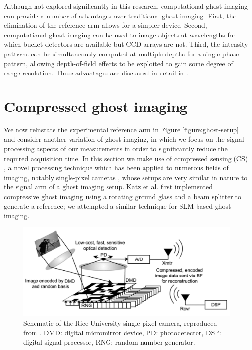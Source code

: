 Although not explored significantly in this research, computational ghost imaging can provide a number of advantages over traditional ghost imaging. First, the elimination of the reference arm allows for a simpler device. Second, computational ghost imaging can be used to image objects at wavelengths for which bucket detectors are available but CCD arrays are not. Third, the intensity patterns can be simultaneously computed at multiple depths for a single phase pattern, allowing depth-of-field effects to be exploited to gain some degree of range resolution. These advantages are discussed in detail in \cite{erkmen-from}.

\section{Compressed ghost imaging}

We now reinstate the experimental reference arm in Figure \ref{figure:ghost-setup} and consider another variation of ghost imaging, in which we focus on the signal processing aspects of our measurements in order to significantly reduce the required acquisition time. In this section we make use of compressed sensing (CS) \cite{candes-stable}, a novel processing technique which has been applied to numerous fields of imaging, notably single-pixel cameras \cite{duarte-single}, whose setups are very similar in nature to the signal arm of a ghost imaging setup. Katz et al. \cite{katz-compressive} first implemented compressive ghost imaging using a rotating ground glass and a beam splitter to generate a reference; we attempted a similar technique for SLM-based ghost imaging.

\begin{figure}[t]
\begin{center}
\includegraphics[width=14cm]{figure-ghost-cscam.pdf}
\caption{Schematic of the Rice University single pixel camera, reproduced from \cite{takhar-new}. DMD: digital micromirror device, PD: photodetector, DSP: digital signal processor, RNG: random number generator.}
\label{figure:ghost-cscam}
\end{center}
\end{figure}

